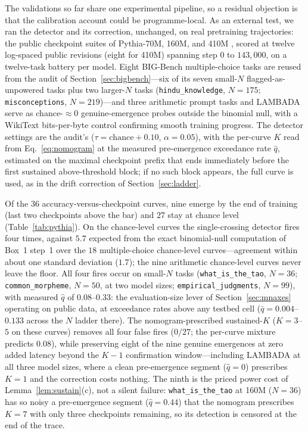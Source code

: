 \documentclass[11pt]{article}
\theoremstyle{plain}
\theoremstyle{definition}
\begin{document}
The validations so far share one experimental pipeline, so a residual objection is that
the calibration account could be programme-local. As an external test, we ran the
detector and its correction, unchanged, on real pretraining trajectories: the public
checkpoint suites of Pythia-70M, 160M, and 410M \citep{biderman2023pythia}, scored at
twelve log-spaced public revisions (eight for 410M) spanning step $0$ to $143{,}000$, on
a twelve-task battery per model. Eight BIG-Bench multiple-choice tasks are reused from
the audit of Section~\ref{sec:bigbench}---six of its seven small-$N$
flagged-as-unpowered tasks plus two larger-$N$ tasks (\texttt{hindu\_knowledge},
$N{=}175$; \texttt{misconceptions}, $N{=}219$)---and three arithmetic prompt tasks and
LAMBADA \citep{paperno2016lambada} serve as chance-${\approx}0$ genuine-emergence probes
outside the binomial null, with a WikiText bits-per-byte control confirming smooth
training progress. The detector settings are the audit's ($\tau=\text{chance}+0.10$,
$\alpha=0.05$), with the per-curve $K$ read from Eq.~\eqref{eq:nomogram} at the measured
pre-emergence exceedance rate $\hat q$, estimated on the maximal checkpoint prefix that
ends immediately before the first sustained above-threshold block; if no such block
appears, the full curve is used, as in the drift correction of
Section~\ref{sec:ladder}.

Of the $36$ accuracy-versus-checkpoint curves, nine emerge by the end of training (last
two checkpoints above the bar) and $27$ stay at chance level (Table~\ref{tab:pythia}).
On the chance-level curves the single-crossing detector fires four times, against $5.7$
expected from the exact binomial-null computation of Box~1 step~1 over the $18$
multiple-choice chance-level curves---agreement within about one standard deviation
($1.7$); the nine arithmetic chance-level curves never leave the floor. All four fires
occur on small-$N$ tasks (\texttt{what\_is\_the\_tao}, $N{=}36$;
\texttt{common\_morpheme}, $N{=}50$, at two model sizes; \texttt{empirical\_judgments},
$N{=}99$), with measured $\hat q$ of $0.08$--$0.33$: the evaluation-size lever of
Section~\ref{sec:mnaxes} operating on public data, at exceedance rates above any
testbed cell ($\bar q=0.004$--$0.133$ across the $N$ ladder there). The
nomogram-prescribed sustained-$K$ ($K=3$--$5$ on these curves) removes all four false
fires ($0/27$; the per-curve mixture predicts $0.08$), while preserving eight of the
nine genuine emergences at zero added latency beyond the $K{-}1$ confirmation
window---including LAMBADA at all three model sizes, where a clean pre-emergence
segment ($\hat q=0$) prescribes $K{=}1$ and the correction costs nothing. The ninth is
the priced power cost of Lemma~\ref{lem:sustain}(c), not a silent failure:
\texttt{what\_is\_the\_tao} at 160M ($N{=}36$) has so noisy a pre-emergence segment
($\hat q=0.44$) that the nomogram prescribes $K{=}7$ with only three checkpoints
remaining, so its detection is censored at the end of the trace.
\end{document}

